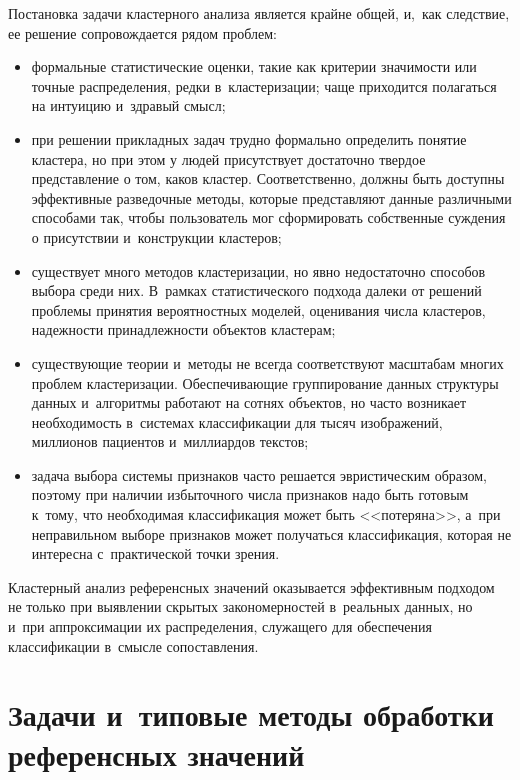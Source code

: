 \begin{multicols}{2}
     Постановка задачи кластерного анализа является крайне общей, и,~как
следствие, ее решение сопровождается рядом проблем:
     \begin{itemize}
\item формальные статистические оценки, такие как критерии значимости
или точные распределения, редки в~кластеризации; чаще приходится
полагаться на интуицию и~здравый смысл;
\item при решении прикладных задач трудно формально определить понятие
кластера, но при этом у людей присутствует достаточно твердое
представление о том, каков кластер. Соответственно, должны быть
доступны эффективные разведочные методы, которые представляют данные
различными способами так, чтобы пользователь мог сформировать
собственные суждения о присутствии и~конструкции кластеров;
\item существует много методов кластеризации, но явно недостаточно
способов выбора среди них. В~рамках статистического подхода далеки от
решений проблемы принятия вероятностных моделей, оценивания числа
кластеров, надежности принадлежности объектов кластерам;
\item существующие теории и~методы не всегда соответствуют масштабам
многих проблем клас\-те\-ри\-за\-ции. Обеспечивающие группирование данных
структуры данных и~алгоритмы работают на сотнях объектов, но часто
возникает необходимость в~системах классификации для тысяч
изображений, миллионов пациентов и~миллиардов текстов;
\item задача выбора системы признаков часто решается эвристическим
образом, поэтому при наличии избыточного числа признаков надо быть
готовым к~тому, что необходимая классификация может быть <<потеряна>>,
а~при неправильном выборе признаков может получаться классификация,
которая не интересна с~практической точки зрения.
\end{itemize}

     Кластерный анализ референсных значений оказывается эффективным
подходом не только при выявлении скрытых закономерностей в~реальных
данных, но и~при аппроксимации их распределения, служащего для
обеспечения классификации в~смысле сопоставления.

\section{Задачи и~типовые методы обработки референсных
значений}


\end{multicols}
